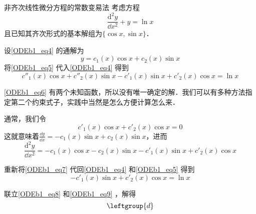 \begin{example}{非齐次线性微分方程的常数变易法}
考虑方程
\begin{equation}\label{ODEb1_eq4}
\frac{\mathrm{d}^2 y}{\dd x^2}+y=\ln x
\end{equation}
且已知其齐次形式的基本解组为$\{\cos x, \sin x\}$．

设\autoref{ODEb1_eq4} 的通解为
\begin{equation}\label{ODEb1_eq5}
y=c_1(x)\cos x+c_2(x)\sin x
\end{equation}
将\autoref{ODEb1_eq5} 代入\autoref{ODEb1_eq4} 得到
\begin{equation}\label{ODEb1_eq6}
c''_1(x)\cos x+c''_2(x)\sin x-c'_1(x)\sin x+c'_2(x)\cos x=\ln x
\end{equation}

\autoref{ODEb1_eq6} 有两个未知函数，所以没有唯一确定的解．我们可以有多种方法指定第二个约束式子，实践中当然是怎么方便计算怎么来．

通常，我们令
\begin{equation}\label{ODEb1_eq8}
c'_1(x)\cos x+c'_2(x)\cos x=0
\end{equation}
这就意味着$\frac{\dd y}{\dd x}=-c_1(x)\sin x+c_2(x)\sin x$，进而
\begin{equation}\label{ODEb1_eq7}
\frac{\mathrm{d}^2 y}{\dd x^2}=-c_1(x)\cos x-c_2(x)\sin x-c'_1(x)\sin x+c'_2(x)\cos x
\end{equation}

重新将\autoref{ODEb1_eq7} 代回\autoref{ODEb1_eq4} 和\autoref{ODEb1_eq5} 得到
\begin{equation}\label{ODEb1_eq9}
-c'_1(x)\sin x+c'_2(x)\cos x=\ln x
\end{equation}

联立\autoref{ODEb1_eq8} 和\autoref{ODEb1_eq9} ，解得
\begin{equation}
\leftgroup{
d
}
\end{equation}

\end{example}




















